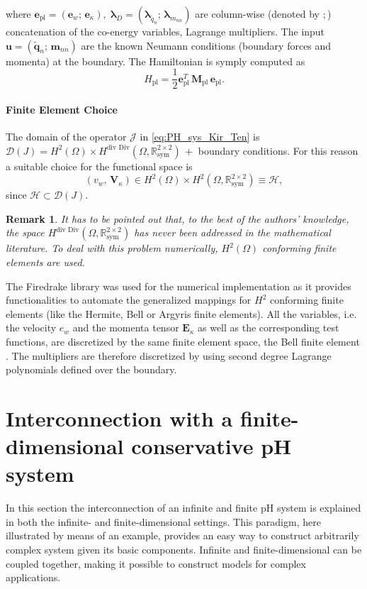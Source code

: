 \documentclass[letterpaper, 10 pt, conference]{ieeeconf}
\newtheorem{remark}{Remark}
\begin{document}
where $\bm{e}_{\text{pl}} = (\bm{e}_w; \, \bm{e}_\kappa), \;  \bm{\lambda}_D = (\bm{\lambda}_{\widetilde{q}_n}; \, \bm{\lambda}_{m_{nn}})$ are column-wise (denoted by $;$) concatenation of the co-energy variables, Lagrange multipliers. The input $\bm{u} = (\widetilde{\bm{q}}_n; \, \bm{m}_{nn})$ are the known Neumann conditions (boundary forces and momenta) at the boundary. 
 The Hamiltonian is symply computed as
\begin{equation} \label{eq:H_discr}
H_{\text{pl}} = \frac{1}{2} \bm{e}_{\text{pl}}^T \, \bm{M}_{\text{pl}} \, \bm{e}_{\text{pl}}.
\end{equation}

\paragraph{Finite Element Choice}
\label{par:FE}
The domain of the operator $\mathcal{J}$ in \eqref{eq:PH_sys_Kir_Ten} is $\mathcal{D}(J) = H^{2}(\Omega) \times  H^{\text{div Div}}(\Omega, \mathbb{R}^{2 \times 2}_{\text{sym}}) \,+ $ boundary conditions. For this reason a suitable choice for the functional space is
\begin{equation}
(v_w, \,\bm{V}_\kappa) \in H^{2}(\Omega) \times H^{2}(\Omega, \mathbb{R}^{2 \times 2}_{\text{sym}}) \equiv \mathscr{H},
\end{equation}
since $\mathscr{H} \subset \mathcal{D}(J)$. 
\begin{remark}
It has to be pointed out that, to the best of the authors' knowledge, the space $H^{\text{div Div}}(\Omega, \mathbb{R}^{2 \times 2}_{\text{sym}})$ has never been addressed in the mathematical literature. To deal with this problem numerically, $H^{2}(\Omega)$ conforming finite elements are used. 
\end{remark}
The Firedrake library \cite{firedrake} was used for the numerical implementation  as it provides functionalities to automate the generalized mappings for $H^2$ conforming finite elements (like the Hermite, Bell or Argyris finite elements). All the variables, i.e. the velocity $e_w$ and the momenta tensor $\bm{E}_\kappa$ as well as the corresponding test functions, are discretized by the same finite element space, the Bell finite element \cite{Bell}. The multipliers are therefore discretized by using second degree Lagrange polynomials defined over the boundary.


\section{Interconnection with a finite-dimensional conservative pH system}
\label{sec:Int}
In this section the interconnection of an infinite and finite pH system is explained in both the infinite- and finite-dimensional settings. This paradigm, here illustrated by means of an example, provides an easy way to construct arbitrarily complex system given its basic components. 
Infinite and finite-dimensional can be coupled together, making it possible to construct models for complex applications. 
\end{document}
